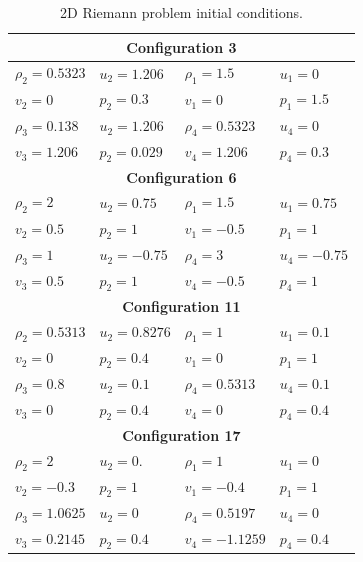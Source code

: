 \begin{table}[!ht]
    \centering
    \begin{tabular}{|l l | l l|}
    \hline 
    \multicolumn{4}{|c|}{\textbf{Configuration 3}} \\
    \hline 
   $\rho_2 = 0.5323$  &  $u_2 = 1.206$   &  $\rho_1 = 1.5$    & $u_1 = 0$     \\
   $v_2 = 0$          &  $p_2 = 0.3$     &  $v_1 = 0$         & $p_1 = 1.5$   \\  
    \hline 
    $\rho_3 = 0.138$  &  $u_2 = 1.206$   &  $\rho_4 = 0.5323$ & $u_ 4= 0$     \\
    $v_3 = 1.206$      &  $p_2 = 0.029$   &  $v_4 = 1.206$    & $p_4 = 0.3$  \\  \hline
    \hline 
    \multicolumn{4}{|c|}{\textbf{Configuration 6}} \\
    \hline 
   $\rho_2 = 2     $  &  $u_2 = 0.75 $   &  $\rho_1 = 1.5$    & $u_1 = 0.75$     \\
   $v_2 = 0.5$        &  $p_2 = 1  $     &  $v_1 = -0.5$      & $p_1 = 1$   \\  
    \hline 
   $\rho_3 = 1$       &  $u_2 = -0.75$   &  $\rho_4 = 3$      & $u_4 = -0.75$     \\
   $v_3 = 0.5$        &  $p_2 = 1$       &  $v_4 = -0.5$      & $p_4 =1$  \\  \hline
    \hline 
    \multicolumn{4}{|c|}{\textbf{Configuration 11}} \\
    \hline 
   $\rho_2 = 0.5313$  &  $u_2 = 0.8276$  &  $\rho_1 = 1$      & $u_1 = 0.1$     \\
   $v_2 = 0  $        &  $p_2 = 0.4$     &  $v_1 = 0$         & $p_1 = 1$   \\  
    \hline 
   $\rho_3 = 0.8$     &  $u_2 = 0.1$     &  $\rho_4 = 0.5313$ & $u_4 = 0.1$     \\
   $v_3 = 0$          &  $p_2 = 0.4$     &  $v_4 = 0$         & $p_4 =0.4$  \\  \hline
    \hline 
    \multicolumn{4}{|c|}{\textbf{Configuration 17}} \\
    \hline 
   $\rho_2 = 2     $  &  $u_2 = 0.   $   &  $\rho_1 = 1$      & $u_1 = 0$     \\
   $v_2 = -0.3$       &  $p_2 = 1  $     &  $v_1 = -0.4$      & $p_1 = 1$   \\  
    \hline 
   $\rho_3 = 1.0625$  &  $u_2 = 0$       &  $\rho_4 = 0.5197$ & $u_4 = 0$     \\
   $v_3 = 0.2145$     &  $p_2 = 0.4$     &  $v_4 = -1.1259$   & $p_4 =0.4$  \\  \hline
    \end{tabular} 
    \caption{2D Riemann problem initial conditions. }
    \label{IC:Riemann}
\end{table}

